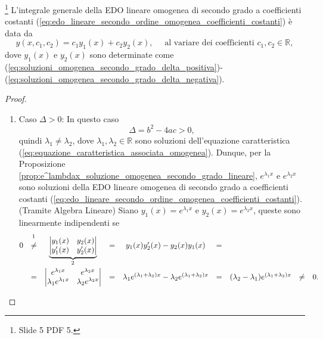 \begin{theorem}\footnote{Slide 5 PDF 5.}
	L'integrale generale della EDO lineare omogenea di secondo grado a coefficienti costanti (\ref{eq:edo_lineare_secondo_ordine_omogenea_coefficienti_costanti}) è data da
	\begin{equation*}
		y(x,c_1,c_2) = c_1y_1(x) + c_2y_2(x),\quad \text{ al variare dei coefficienti } c_1,c_2\in\mathbb{R},
	\end{equation*}
	dove $y_1(x)$ e $y_2(x)$ sono determinate come (\ref{eq:soluzioni_omogenea_secondo_grado_delta_positiva})-(\ref{eq:soluzioni_omogenea_secondo_grado_delta_negativa}).
\end{theorem}
\begin{proof}
	\begin{enumerate}
		\item Caso $\Delta>0$: In questo caso
		\begin{equation*}
			\Delta = b^2-4ac>0,
		\end{equation*}
		quindi $\lambda_1\neq \lambda_2$, dove $\lambda_1,\lambda_2\in\mathbb{R}$ sono soluzioni dell'equazione caratteristica (\ref{eq:equazione_caratteristica_associata_omogenea}). Dunque, per la Proposizione \ref{prop:e^lambdax_soluzione_omogenea_secondo_grado_lineare}, $e^{\lambda_1 x}$ e $e^{\lambda_2 x}$ sono soluzioni della EDO lineare omogenea di secondo grado a coefficienti costanti (\ref{eq:edo_lineare_secondo_ordine_omogenea_coefficienti_costanti}).\\
		\footnotemark (Tramite Algebra Lineare) Siano $y_1(x) = e^{\lambda_1 x}$ e $y_2(x) = e^{\lambda_2 x}$, queste sono linearmente indipendenti se
		\begin{equation*}
			\begin{matrix}
				0 &\overset{\footnotemark}{\neq}& \underbrace{\begin{vmatrix}
						y_1(x) & y_2(x)\\
						y_1'(x) & y_2'(x)
				\end{vmatrix}}_{\footnotemark} &=& y_1(x)y_2'(x) - y_2(x)y_1(x) &=&\\
				&=&
				\begin{vmatrix}
					e^{\lambda_1x} & e^{\lambda_2 x}\\
					\lambda_1 e^{\lambda_1x} & \lambda_2 e^{\lambda_2 x}
				\end{vmatrix} &=& \lambda_1 e^{(\lambda_1+\lambda_2)x} - \lambda_2 e^{(\lambda_1+\lambda_2)x} &=& (\lambda_2 -\lambda_1) e^{(\lambda_1+\lambda_2)x} &\neq& 0. 
			\end{matrix}

\end{equation*}
\end{enumerate}
\end{proof}
